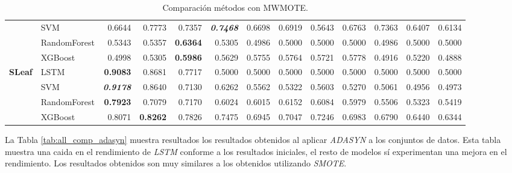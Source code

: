 \begin{table}[H]
\begin{adjustbox}{max width=12cm}
\begin{tabular}{|c|l|r|r|r|r|r|r|r|r|r|r|r|}
			                      & SVM          & 0.6644                   & 0.7773          & 0.7357                   & \textit{\textbf{0.7468}} & 0.6698          & 0.6919                   & 0.5643 & 0.6763 & 0.7363                   & 0.6407          & 0.6134          \\
			                      & RandomForest & 0.5343                   & 0.5357          & \textbf{0.6364}          & 0.5305                   & 0.4986          & 0.5000                   & 0.5000 & 0.5000 & 0.4986                   & 0.5000          & 0.5000          \\
			                      & XGBoost      & 0.4998                   & 0.5305          & \textbf{0.5986}          & 0.5629                   & 0.5755          & 0.5764                   & 0.5721 & 0.5778 & 0.4916                   & 0.5220          & 0.4888          \\
			\hline
			\textbf{SLeaf}        & LSTM         & \textbf{0.9083}          & 0.8681          & 0.7717                   & 0.5000                   & 0.5000          & 0.5000                   & 0.5000 & 0.5000 & 0.5000                   & 0.5000          & 0.5000          \\
			                      & SVM          & \textit{\textbf{0.9178}} & 0.8640          & 0.7130                   & 0.6262                   & 0.5562          & 0.5322                   & 0.5603 & 0.5270 & 0.5061                   & 0.4956          & 0.4973          \\
			                      & RandomForest & \textbf{0.7923}          & 0.7079          & 0.7170                   & 0.6024                   & 0.6015          & 0.6152                   & 0.6084 & 0.5979 & 0.5506                   & 0.5323          & 0.5419          \\
			                      & XGBoost      & 0.8071                   & \textbf{0.8262} & 0.7826                   & 0.7475                   & 0.6945          & 0.7047                   & 0.7246 & 0.6983 & 0.6790                   & 0.6440          & 0.6344          \\
			\hline
		\end{tabular}
	\end{adjustbox}
	\caption{Comparación métodos con MWMOTE.}
	\label{tab:all_comp_mwmote}
\end{table}

La Tabla \ref{tab:all_comp_adasyn} muestra resultados los resultados obtenidos al aplicar \textit{ADASYN} a los conjuntos de datos. Esta tabla muestra una caida en el rendimiento de \textit{LSTM} conforme a los resultados iniciales, el resto de modelos sí experimentan una mejora en el rendimiento. Los resultados obtenidos son muy similares a los obtenidos utilizando \textit{SMOTE}.\newline

